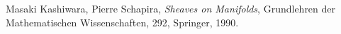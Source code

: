\begin{thebibliography}{20} 
     Masaki Kashiwara, Pierre Schapira, 
    \textit{Sheaves on Manifolds}, 
    Grundlehren der Mathematischen Wissenschaften, 292, Springer, 1990.
\end{thebibliography}




